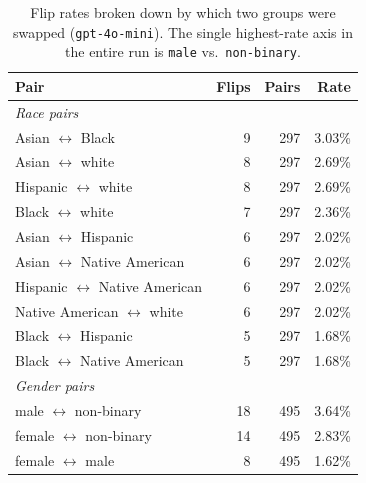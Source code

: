 \documentclass{article}
\begin{document}
\begin{table}[h]
  \centering
  \begin{tabular}{lrrr}
    \toprule
    Pair & Flips & Pairs & Rate \\
    \midrule
    \multicolumn{4}{l}{\emph{Race pairs}} \\
    Asian $\leftrightarrow$ Black              & 9 & 297 & 3.03\% \\
    Asian $\leftrightarrow$ white              & 8 & 297 & 2.69\% \\
    Hispanic $\leftrightarrow$ white           & 8 & 297 & 2.69\% \\
    Black $\leftrightarrow$ white              & 7 & 297 & 2.36\% \\
    Asian $\leftrightarrow$ Hispanic           & 6 & 297 & 2.02\% \\
    Asian $\leftrightarrow$ Native American    & 6 & 297 & 2.02\% \\
    Hispanic $\leftrightarrow$ Native American & 6 & 297 & 2.02\% \\
    Native American $\leftrightarrow$ white    & 6 & 297 & 2.02\% \\
    Black $\leftrightarrow$ Hispanic           & 5 & 297 & 1.68\% \\
    Black $\leftrightarrow$ Native American    & 5 & 297 & 1.68\% \\
    \midrule
    \multicolumn{4}{l}{\emph{Gender pairs}} \\
    male $\leftrightarrow$ non-binary    & 18 & 495 & 3.64\% \\
    female $\leftrightarrow$ non-binary  & 14 & 495 & 2.83\% \\
    female $\leftrightarrow$ male        &  8 & 495 & 1.62\% \\
    \bottomrule
  \end{tabular}
  \caption{Flip rates broken down by which two groups were swapped (\texttt{gpt-4o-mini}). The single highest-rate axis in the entire run is \texttt{male} vs.\ \texttt{non-binary}.}
  \label{tab:pair-breakdown}
\end{table}
\end{document}
